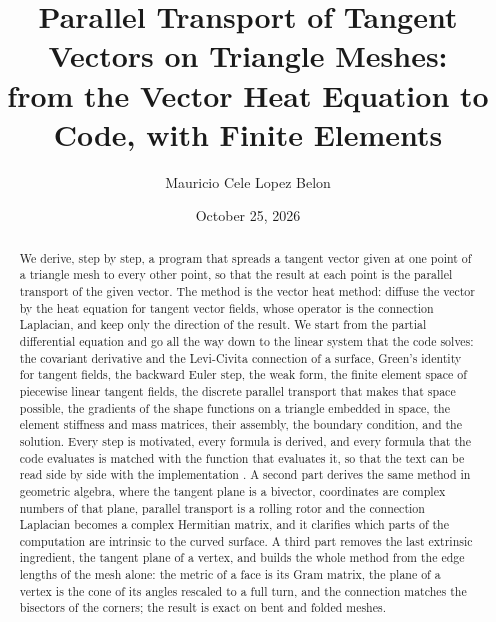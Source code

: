 \documentclass{birkjour}
\numberwithin{equation}{section}
\begin{document}
\title[From the Vector Heat Equation to Code]
 {Parallel Transport of Tangent Vectors on Triangle Meshes:\\ from the Vector Heat Equation to Code, with Finite Elements}

\author[Mauricio Cele Lopez Belon]{Mauricio Cele Lopez Belon}
\address{Madrid, Spain}

\date{October 25, 2026}

\begin{abstract}
We derive, step by step, a program that spreads a tangent vector given at one point of a triangle mesh to every other point, so that the result at each point is the parallel transport of the given vector. The method is the vector heat method: diffuse the vector by the heat equation for tangent vector fields, whose operator is the connection Laplacian, and keep only the direction of the result. We start from the partial differential equation and go all the way down to the linear system that the code solves: the covariant derivative and the Levi-Civita connection of a surface, Green's identity for tangent fields, the backward Euler step, the weak form, the finite element space of piecewise linear tangent fields, the discrete parallel transport that makes that space possible, the gradients of the shape functions on a triangle embedded in space, the element stiffness and mass matrices, their assembly, the boundary condition, and the solution. Every step is motivated, every formula is derived, and every formula that the code evaluates is matched with the function that evaluates it, so that the text can be read side by side with the implementation \cite{ConnectionLaplacianFEM}. A second part derives the same method in geometric algebra, where the tangent plane is a bivector, coordinates are complex numbers of that plane, parallel transport is a rolling rotor and the connection Laplacian becomes a complex Hermitian matrix, and it clarifies which parts of the computation are intrinsic to the curved surface. A third part removes the last extrinsic ingredient, the tangent plane of a vertex, and builds the whole method from the edge lengths of the mesh alone: the metric of a face is its Gram matrix, the plane of a vertex is the cone of its angles rescaled to a full turn, and the connection matches the bisectors of the corners; the result is exact on bent and folded meshes.
\end{abstract}
\end{document}
